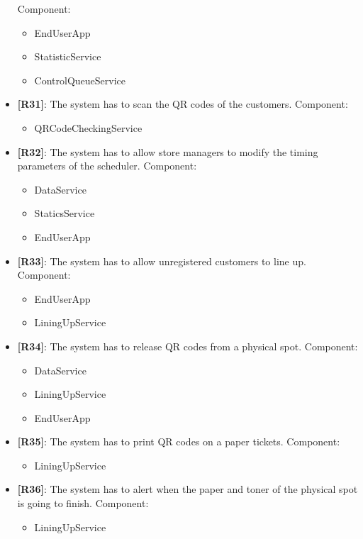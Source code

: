 \begin{itemize}
    Component:
    \begin{itemize}
        \item EndUserApp
        \item StatisticService
        \item ControlQueueService
    \end{itemize}
    \item {\textbf{[R31]}}: The system has to scan the QR codes of the customers.
    Component:
    \begin{itemize}
        \item QRCodeCheckingService
    \end{itemize}
    \item {\textbf{[R32]}}: The system has to allow store managers to modify the timing parameters of the scheduler.
    Component:
    \begin{itemize}
        \item DataService
        \item StaticsService
        \item EndUserApp
    \end{itemize}
    \item {\textbf{[R33]}}: The system has to allow unregistered customers to line up.
    Component:
    \begin{itemize}
        \item EndUserApp
        \item LiningUpService
    \end{itemize}
    \item {\textbf{[R34]}}: The system has to release QR codes from a physical spot.
    Component:
    \begin{itemize}
        \item DataService
        \item LiningUpService
        \item EndUserApp
    \end{itemize}
    \item {\textbf{[R35]}}: The system has to print QR codes on a paper tickets.
    Component:
    \begin{itemize}
        \item LiningUpService
    \end{itemize}
    \item {\textbf{[R36]}}: The system has to alert when the paper and toner of the physical spot is going to finish.
    Component:
    \begin{itemize}
        \item LiningUpService

\end{itemize}
\end{itemize}
